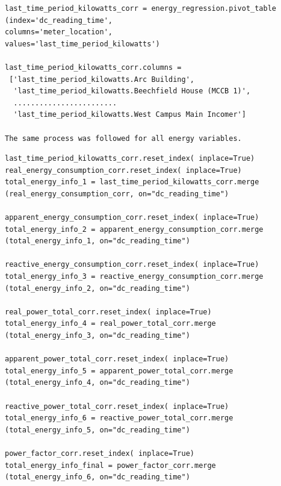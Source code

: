 \documentclass[12pt]{scrartcl}
\begin{document}
\begin{lstlisting}[frame=single,basicstyle=\footnotesize\ttfamily,
  caption={Python - Pivot Data around the meter reading time},label={list:[Pivot Data around the meter reading time]}]
last_time_period_kilowatts_corr = energy_regression.pivot_table
(index='dc_reading_time',
columns='meter_location',
values='last_time_period_kilowatts')

last_time_period_kilowatts_corr.columns =
 ['last_time_period_kilowatts.Arc Building',
  'last_time_period_kilowatts.Beechfield House (MCCB 1)',
  ........................
  'last_time_period_kilowatts.West Campus Main Incomer']
    
The same process was followed for all energy variables.

\end{lstlisting}

\begin{lstlisting}[frame=single,basicstyle=\footnotesize\ttfamily,
  caption={Python - Merge Energy Pivot Tables together},label={list:[Merge Pivot Tables together]}]
last_time_period_kilowatts_corr.reset_index( inplace=True)
real_energy_consumption_corr.reset_index( inplace=True)
total_energy_info_1 = last_time_period_kilowatts_corr.merge
(real_energy_consumption_corr, on="dc_reading_time")

apparent_energy_consumption_corr.reset_index( inplace=True)
total_energy_info_2 = apparent_energy_consumption_corr.merge
(total_energy_info_1, on="dc_reading_time")

reactive_energy_consumption_corr.reset_index( inplace=True)
total_energy_info_3 = reactive_energy_consumption_corr.merge
(total_energy_info_2, on="dc_reading_time")

real_power_total_corr.reset_index( inplace=True)
total_energy_info_4 = real_power_total_corr.merge
(total_energy_info_3, on="dc_reading_time")

apparent_power_total_corr.reset_index( inplace=True)
total_energy_info_5 = apparent_power_total_corr.merge
(total_energy_info_4, on="dc_reading_time")

reactive_power_total_corr.reset_index( inplace=True)
total_energy_info_6 = reactive_power_total_corr.merge
(total_energy_info_5, on="dc_reading_time")

power_factor_corr.reset_index( inplace=True)
total_energy_info_final = power_factor_corr.merge
(total_energy_info_6, on="dc_reading_time")

\end{lstlisting}
\end{document}
